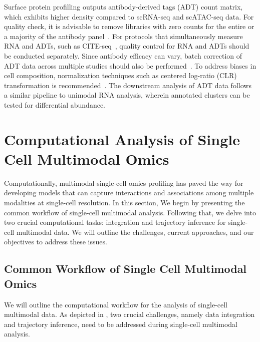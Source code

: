 Surface protein profilling outputs antibody-derived tags (ADT) count matrix, which exhibits higher density compared to scRNA-seq and scATAC-seq data. For quality check, it is advisable to remove libraries with zero counts for the entire or a majority of the antibody panel~\citep{amezquita2020adtqc}. For protocols that simultaneously measure RNA and ADTs, such as CITE-seq~\citep{citeseq2017}, quality control for RNA and ADTs should be conducted separately. Since antibody efficacy can vary, batch correction of ADT data across multiple studies should also be performed~\citep{zheng2022adtqc}. To address biases in cell composition, normalization techniques such as centered log-ratio (CLR) transformation is recommended~\citep{stoeckius2017citeseq}. The downstream analysis of ADT data follows a similar pipeline to unimodal RNA analysis, wherein annotated clusters can be tested for differential abundance.


\section{Computational Analysis of Single Cell Multimodal Omics}
\label{background:multimodal}
Computationally, multimodal single-cell omics profiling has paved the way for developing models that can capture interactions and associations among multiple modalities at single-cell resolution. In this section, We begin by presenting the common workflow of single-cell multimodal analysis. Following that, we delve into two crucial computational tasks: integration and trajectory inference for single-cell multimodal data. We will outline the challenges, current approaches, and our objectives to address these issues.

\subsection{Common Workflow of Single Cell Multimodal Omics}
\label{background:multimodal}
We will outline the computational workflow for the analysis of single-cell multimodal data. As depicted in , two crucial challenges, namely data integration and trajectory inference, need to be addressed during single-cell multimodal analysis.

